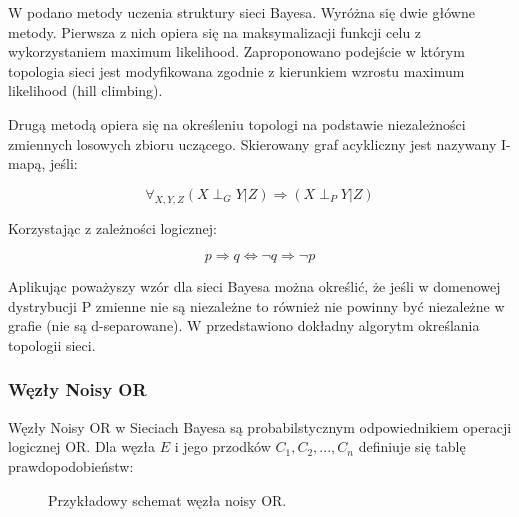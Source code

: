 \documentclass{article}
\begin{document}
W \cite{PhD} podano metody uczenia struktury sieci Bayesa. Wyróżna się dwie główne metody. Pierwsza z nich opiera się na maksymalizacji funkcji celu z wykorzystaniem maximum likelihood. Zaproponowano podejście w którym topologia sieci jest modyfikowana zgodnie z kierunkiem wzrostu maximum likelihood (hill climbing).

Drugą metodą opiera się na określeniu topologi na podstawie niezależności zmiennych losowych zbioru uczącego. Skierowany graf acykliczny jest nazywany I-mapą, jeśli:

\begin{equation}
	\forall_{X, Y, Z} (X \perp_G Y| Z) 	\Rightarrow  (X \perp_P Y | Z)
\end{equation}

Korzystając z zależności logicznej:

\begin{equation}
	p \Rightarrow q \Leftrightarrow \neg q \Rightarrow \neg p
\end{equation}

Aplikując poważyszy wzór dla sieci Bayesa można określić, że jeśli w domenowej dystrybucji P zmienne nie są niezależne to również nie powinny być niezależne w grafie (nie są d-separowane). W \cite{PhD} przedstawiono dokładny algorytm określania topologii sieci.

\subsubsection{Węzły Noisy OR}

Węzły Noisy OR w Sieciach Bayesa są probabilstycznym odpowiednikiem operacji logicznej OR. Dla węzła $E$ i jego przodków $C_1, C_2, ..., C_n$ definiuje się tablę prawdopodobieństw:

\begin{figure}
\centering
{}
\caption{Przykładowy schemat węzła noisy OR.}
\end{figure}
\end{document}
